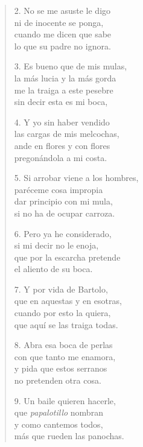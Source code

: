 \documentclass{vcscores}
\begin{document}
\begin{multicols}{2}
\begin{verse}
2. No se me asuste le digo \\
ni de inocente se ponga, \\
cuando me dicen que sabe \\
lo que su padre no ignora. 

3. Es bueno que de mis mulas, \\
la más lucia y la más gorda \\
me la traiga a este pesebre \\
sin decir esta es mi boca,

4. Y yo sin haber vendido \\
las cargas de mis melcochas, \\
ande en flores y con flores \\
pregonándola a mi costa. 

5. Si arrobar viene a los hombres, \\
paréceme cosa impropia \\
dar principio con mi mula, \\
si no ha de ocupar carroza. 

6. Pero ya he considerado, \\
si mi decir no le enoja, \\
que por la escarcha pretende \\
el aliento de su boca.  

7. Y por vida de Bartolo, \\
que en aquestas y en esotras, \\
cuando por esto la quiera, \\
que aquí se las traiga todas. 

8. Abra esa boca de perlas \\
con que tanto me enamora, \\
y pida que estos serranos \\
no pretenden otra cosa. 

9. Un baile quieren hacerle, \\
que \emph{papalotillo} nombran \\
y como cantemos todos, \\
más que rueden las panochas.
\end{verse}
\end{multicols}
\end{document}
